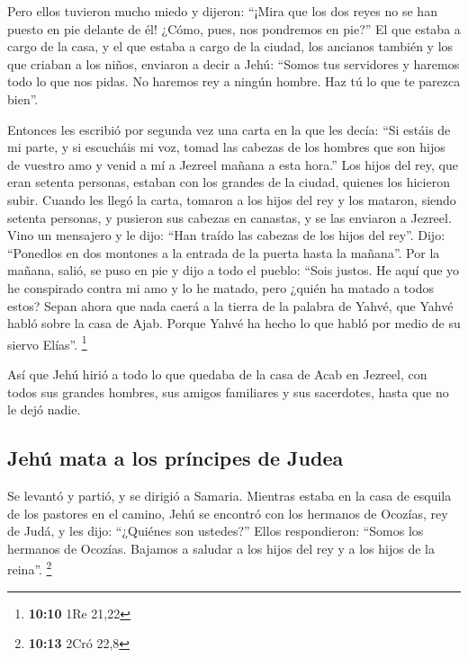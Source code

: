 \begin{paracol}{2}
 Pero ellos tuvieron mucho miedo y dijeron: ``¡Mira que
los dos reyes no se han puesto en pie delante de él! ¿Cómo, pues, nos
pondremos en pie?''  El que estaba a cargo de la casa, y
el que estaba a cargo de la ciudad, los ancianos también y los que
criaban a los niños, enviaron a decir a Jehú: ``Somos tus servidores y
haremos todo lo que nos pidas. No haremos rey a ningún hombre. Haz tú lo
que te parezca bien''.

 Entonces les escribió por segunda vez una carta en la que
les decía: ``Si estáis de mi parte, y si escucháis mi voz, tomad las
cabezas de los hombres que son hijos de vuestro amo y venid a mí a
Jezreel mañana a esta hora.'' Los hijos del rey, que eran setenta
personas, estaban con los grandes de la ciudad, quienes los hicieron
subir.  Cuando les llegó la carta, tomaron a los hijos del
rey y los mataron, siendo setenta personas, y pusieron sus cabezas en
canastas, y se las enviaron a Jezreel.  Vino un mensajero
y le dijo: ``Han traído las cabezas de los hijos del rey''. Dijo:
``Ponedlos en dos montones a la entrada de la puerta hasta la mañana''.
 Por la mañana, salió, se puso en pie y dijo a todo el
pueblo: ``Sois justos. He aquí que yo he conspirado contra mi amo y lo
he matado, pero ¿quién ha matado a todos estos?  Sepan
ahora que nada caerá a la tierra de la palabra de Yahvé, que Yahvé habló
sobre la casa de Ajab. Porque Yahvé ha hecho lo que habló por medio de
su siervo Elías''. \footnote{\textbf{10:10} 1Re 21,22}

 Así que Jehú hirió a todo lo que quedaba de la casa de
Acab en Jezreel, con todos sus grandes hombres, sus amigos familiares y
sus sacerdotes, hasta que no le dejó nadie.

\hypertarget{jehuxfa-mata-a-los-pruxedncipes-de-judea}{%
\subsection{Jehú mata a los príncipes de
Judea}\label{jehuxfa-mata-a-los-pruxedncipes-de-judea}}

 Se levantó y partió, y se dirigió a Samaria. Mientras
estaba en la casa de esquila de los pastores en el camino,
 Jehú se encontró con los hermanos de Ocozías, rey de
Judá, y les dijo: ``¿Quiénes son ustedes?'' Ellos respondieron: ``Somos
los hermanos de Ocozías. Bajamos a saludar a los hijos del rey y a los
hijos de la reina''. \footnote{\textbf{10:13} 2Cró 22,8}


\end{paracol}

